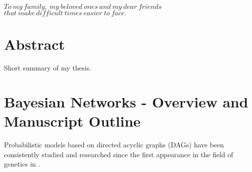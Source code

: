 \documentclass[11pt]{article}
\begin{document}
\begin{article}


\cleardoublepage


\newpage

\markright{}
\begin{center}
    $To \ my \ family,  \ my \ beloved \ ones \ and \ my \ dear \ friends$
    \newline
    $that \ make \ difficult \ times \ easier \ to \ face.$
\end{center}


\newpage
{}
\section*{Abstract}

Short summary of my thesis.

\newpage

\tableofcontents

\newpage

\listoffigures
\listofalgorithms
\listoftables

\newpage


\section{Bayesian Networks - Overview and Manuscript Outline}
\label{sec:org287af4b}


Probabilistic models based on directed acyclic graphs (DAGs) have
been consistently studied and researched since the first appearance
in the field of genetics in \cite{wright1921correlation}.


\end{article}
\end{document}
